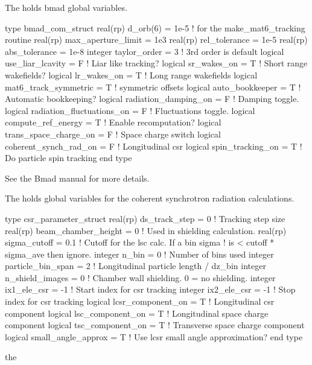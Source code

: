{{{{{{{{{{{The  holds bmad global variables. 
\begin{example}
  type bmad_com_struct
    real(rp) d_orb(6) = 1e-5  ! for the make_mat6_tracking routine
    real(rp) max_aperture_limit = 1e3    
    real(rp) rel_tolerance = 1e-5
    real(rp) abs_tolerance = 1e-8
    integer taylor_order = 3               ! 3rd order is default
    logical use_liar_lcavity = F           ! Liar like tracking?
    logical sr_wakes_on = T                ! Short range wakefields?
    logical lr_wakes_on = T                ! Long range wakefields
    logical mat6_track_symmetric = T       ! symmetric offsets
    logical auto_bookkeeper = T            ! Automatic bookkeeping?
    logical radiation_damping_on = F       ! Damping toggle.
    logical radiation_fluctuations_on = F  ! Fluctuations toggle.
    logical compute_ref_energy = T         ! Enable recomputation?
    logical trans_space_charge_on = F      ! Space charge switch
    logical coherent_synch_rad_on = F      ! Longitudinal csr 
    logical spin_tracking_on = T           ! Do particle spin tracking
  end type
\end{example}
See the Bmad manual for more details.

The  holds global variables for the coherent
synchrotron radiation calculations. 
\begin{example}
  type csr_parameter_struct
    real(rp) ds_track_step = 0          ! Tracking step size
    real(rp) beam_chamber_height = 0    ! Used in shielding calculation.
    real(rp) sigma_cutoff = 0.1         ! Cutoff for the lsc calc. If a bin sigma
                                           !  is < cutoff * sigma_ave then ignore.
    integer n_bin = 0                   ! Number of bins used
    integer particle_bin_span = 2       ! Longitudinal particle length / dz_bin
    integer n_shield_images = 0         ! Chamber wall shielding. 0 = no shielding.
    integer ix1_ele_csr = -1            ! Start index for csr tracking
    integer ix2_ele_csr = -1            ! Stop index for csr tracking
    logical lcsr_component_on = T       ! Longitudinal csr component
    logical lsc_component_on = T        ! Longitudinal space charge component
    logical tsc_component_on = T        ! Transverse space charge component
    logical small_angle_approx = T      ! Use lcsr small angle approximation?
  end type
\end{example}
the \vn{global%
See the Bmad manual for more details.

}}}}}}}}}}}}
